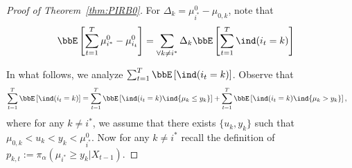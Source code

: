 \documentclass[11pt]{article}
\begin{document}
\begin{proof}[Proof of Theorem~\ref{thm:PIRB0}]
    For $\Delta_k = \mu^0_{i^*} -  \mu_{0,k}$, note that
    \begin{align}
        \bbE  \left[ \sum_{t=1}^{T}\mu^0_{i^*} -  \mu^0_{i_t}  \right] %
        &=  \sum_{\forall k \neq i^*}  \Delta_k \bbE\left[\sum_{t=1}^{T}\ind( i_t=k )\right] 
        \label{eq:MA0}
    \end{align}
    
    In what follows, we analyze $\sum_{t=1}^{T}\bbE\left[ \ind( i_t=k ) \right]$. Observe that
    \begin{align} 
        \sum_{t=1}^{T} \bbE\left[  \ind(i_t=k )\right] &=  \sum_{t=1}^{T} \bbE\left[  \ind(i_t=k )  \ind\{\mu_k \leq y_k  \}   \right] + \sum_{t=1}^{T} \bbE\left[  \ind(i_t=k )  \ind\{\mu_k > y_k  \}   \right],
        \label{eq:MA1}
        \end{align}
        where for any $k\neq i^*$, we assume that there exists $\{u_k,y_k\}$ such that $\mu_{0,k} < u_k < y_k < \mu^0_{i^*}$. Now for any $k \neq i^*$ recall the definition of $p_{k,t}:= \pi_{\alpha}( \mu_{i^*} \geq y_k | X_{t-1} )$.

    


\end{proof}
\end{document}
